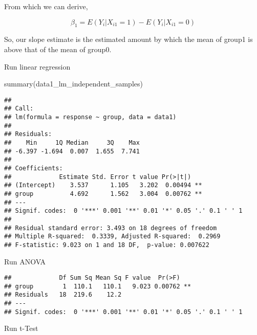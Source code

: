 \documentclass[
]{book}
\newenvironment{Shaded}{\begin{snugshade}}{\end{snugshade}}
\newcommand{\AttributeTok}[1]{\textcolor[rgb]{0.77,0.63,0.00}{#1}}
\newcommand{\FunctionTok}[1]{\textcolor[rgb]{0.00,0.00,0.00}{#1}}
\newcommand{\NormalTok}[1]{#1}
\newcommand{\OtherTok}[1]{\textcolor[rgb]{0.56,0.35,0.01}{#1}}
\newcommand{\SpecialCharTok}[1]{\textcolor[rgb]{0.00,0.00,0.00}{#1}}
\begin{document}
From which we can derive,

\[
\beta_1 = E(Y_i|X_{i1}=1) - E(Y_i|X_{i1}=0)
\]

So, our slope estimate is the estimated amount by which the mean of
group1 is above that of the mean of group0.

Run linear regression

\begin{Shaded}
\begin{Highlighting}[]
\FunctionTok{summary}\NormalTok{(data1\_lm\_independent\_samples)}
\end{Highlighting}
\end{Shaded}

\begin{verbatim}
## 
## Call:
## lm(formula = response ~ group, data = data1)
## 
## Residuals:
##    Min     1Q Median     3Q    Max 
## -6.397 -1.694  0.007  1.655  7.741 
## 
## Coefficients:
##             Estimate Std. Error t value Pr(>|t|)   
## (Intercept)    3.537      1.105   3.202  0.00494 **
## group          4.692      1.562   3.004  0.00762 **
## ---
## Signif. codes:  0 '***' 0.001 '**' 0.01 '*' 0.05 '.' 0.1 ' ' 1
## 
## Residual standard error: 3.493 on 18 degrees of freedom
## Multiple R-squared:  0.3339, Adjusted R-squared:  0.2969 
## F-statistic: 9.023 on 1 and 18 DF,  p-value: 0.007622
\end{verbatim}

Run ANOVA

\begin{Shaded}
\end{Shaded}

\begin{verbatim}
##             Df Sum Sq Mean Sq F value  Pr(>F)   
## group        1  110.1   110.1   9.023 0.00762 **
## Residuals   18  219.6    12.2                   
## ---
## Signif. codes:  0 '***' 0.001 '**' 0.01 '*' 0.05 '.' 0.1 ' ' 1
\end{verbatim}

Run t-Test
\end{document}
